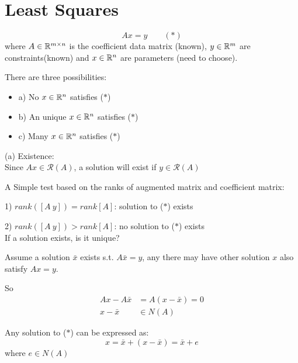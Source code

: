 



\section{Least Squares}
 
\begin{equation*}
Ax = y \qquad (*)
\end{equation*}
where $A\in \mathbb{R}^{m\times n}$ is the coefficient data matrix (known), $y\in \mathbb{R}^m$ are constraints(known) and $x\in \mathbb{R}^n$ are parameters (need to choose).

There are three possibilities:

\begin{itemize}
	\item a) No $x\in \mathbb{R}^n$ satisfies ($*$)
	
	\item b) An unique $x\in \mathbb{R}^n$ satisfies ($*$)
	
	\item c) Many $x\in \mathbb{R}^n$ satisfies ($*$)
\end{itemize}

(a) Existence:\\

Since $Ax\in \mathcal{R}(A)$, a solution will exist if $y\in \mathcal{R}(A)$

A Simple test based on the ranks of augmented matrix and coefficient matrix:

1) $rank([A\ y]) = rank[A]$: solution to ($*$) exists

2) $rank([A\ y]) > rank[A]$: no solution to ($*$) exists\\

\vspace{0.4cm}
If a solution exists, is it unique?

Assume a solution $\bar{x}$ exists s.t. $A\bar{x} = y$, any there may have other solution $x$ also satisfy $Ax = y$. 

So 
\begin{align*}
Ax - A\bar{x} &= A(x -\bar{x}) = 0\\
x - \bar{x} &\in N(A)
\end{align*}

Any solution to ($*$) can be expressed as:
\begin{equation*}
x = \bar{x} + (x - \bar{x}) = \bar{x} + e
\end{equation*}
where $e\in N(A)$

